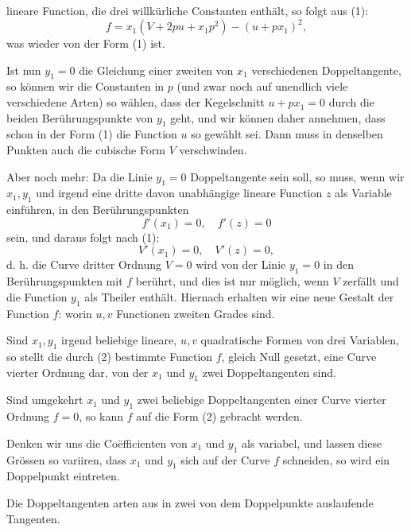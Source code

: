lineare Function, die drei willkürliche Constanten enthält, so
folgt aus (1):
\[
f = x_1 (V + 2pu + x_1p^2) - (u + px_1)^2,
\]
was wieder von der Form (1) ist.

Ist nun $y_1 = 0$ die Gleichung einer zweiten von $x_1$ verschiedenen Doppeltangente, so können wir die Constanten in $p$ (und zwar noch auf unendlich viele verschiedene Arten) so wählen, dass der Kegelschnitt $u + px_1 = 0$ durch die beiden Berührungspunkte von $y_1$ geht, und wir können daher annehmen, dass schon in der Form (1) die Function $u$ so gewählt sei. Dann muss in denselben Punkten auch die cubische Form $V$ verschwinden.

Aber noch mehr: Da die Linie $y_1 = 0$ Doppeltangente sein soll, so muss, wenn wir $x_1, y_1$ und irgend eine dritte davon unabhängige lineare Function $z$ als Variable einführen, in den Berührungspunkten
\[
f'(x_1) = 0, \quad f'(z) = 0
\]
sein, und daraus folgt nach (1):
\[
V'(x_1) = 0, \quad V'(z) = 0,
\]
d. h. die Curve dritter Ordnung $V = 0$ wird von der Linie $y_1 = 0$ in den Berührungspunkten mit $f$ berührt, und dies ist nur möglich, wenn $V$ zerfällt und die Function $y_1$ als Theiler enthält. Hiernach erhalten wir eine neue Gestalt der Function $f$:
worin $u, v$ Functionen zweiten Grades sind.

Sind $x_1, y_1$ irgend beliebige lineare, $u, v$ quadratische Formen von drei Variablen, so stellt die durch (2) bestimmte Function $f$, gleich Null gesetzt, eine Curve vierter Ordnung dar, von der $x_1$ und $y_1$ zwei Doppeltangenten sind.

Sind umgekehrt $x_1$ und $y_1$ zwei beliebige Doppeltangenten einer Curve vierter Ordnung $f = 0$, so kann $f$ auf die Form (2) gebracht werden.

Denken wir uns die Co\"efficienten von $x_1$ und $y_1$ als variabel, und lassen diese Grössen so variiren, dass $x_1$ und $y_1$ sich auf der Curve $f$ schneiden, so wird ein Doppelpunkt eintreten.

Die Doppeltangenten arten aus in zwei von dem Doppelpunkte auslaufende Tangenten.
